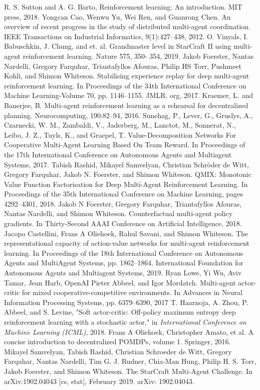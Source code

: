 \documentclass[runningheads]{llncs}
\begin{document}
\begin{thebibliography}{00}
	 R. S. Sutton and A. G. Barto, Reinforcement learning: An introduction.
	MIT press, 2018.
	Yongcan Cao, Wenwu Yu, Wei Ren, and Guanrong Chen. An overview of recent progress in
	the study of distributed multi-agent coordination. IEEE Transactions on Industrial Informatics,
	9(1):427–438, 2012.
	O. Vinyals, I. Babuschkin, J. Chung, and et. al. Grandmaster level in
	StarCraft II using multi-agent reinforcement learning. Nature 575, 350-
	354, 2019.
	Jakob Foerster, Nantas Nardelli, Gregory Farquhar, Triantafyllos Afouras, Philip HS Torr, Pushmeet
	Kohli, and Shimon Whiteson. Stabilising experience replay for deep multi-agent reinforcement
	learning. In Proceedings of the 34th International Conference on Machine Learning-Volume 70,
	pp. 1146–1155. JMLR. org, 2017.
	 Kraemer, L. and Banerjee, B. Multi-agent reinforcement
	learning as a rehearsal for decentralized planning. Neurocomputing,
	190:82–94, 2016.
	 Sunehag, P., Lever, G., Gruslys, A., Czarnecki, W. M., Zambaldi,
	V., Jaderberg, M., Lanctot, M., Sonnerat, N., Leibo,
	J. Z., Tuyls, K., and Graepel, T. Value-Decomposition
	Networks For Cooperative Multi-Agent Learning Based
	On Team Reward. In Proceedings of the 17th International
	Conference on Autonomous Agents and Multiagent
	Systems, 2017.
	 Tabish Rashid, Mikayel Samvelyan, Christian Schröder de Witt, Gregory Farquhar, Jakob N.
	Foerster, and Shimon Whiteson. QMIX: Monotonic Value Function Factorisation for Deep
	Multi-Agent Reinforcement Learning. In Proceedings of the 35th International Conference on
	Machine Learning, pages 4292–4301, 2018.
	 Jakob N Foerster, Gregory Farquhar, Triantafyllos Afouras, Nantas Nardelli, and Shimon Whiteson.
	Counterfactual multi-agent policy gradients. In Thirty-Second AAAI Conference on Artificial
	Intelligence, 2018.
	 Jacopo Castellini, Frans A Oliehoek, Rahul Savani, and Shimon Whiteson. The representational
	capacity of action-value networks for multi-agent reinforcement learning. In Proceedings of the
	18th International Conference on Autonomous Agents and MultiAgent Systems, pp. 1862–1864.
	International Foundation for Autonomous Agents and Multiagent Systems, 2019.
	Ryan Lowe, Yi Wu, Aviv Tamar, Jean Harb, OpenAI Pieter Abbeel, and Igor Mordatch. Multi-agent
	actor-critic for mixed cooperative-competitive environments. In Advances in Neural Information
	Processing Systems, pp. 6379–6390, 2017
	 T. Haarnoja, A. Zhou, P. Abbeel, and S. Levine, "Soft
	actor-critic: Off-policy maximum entropy deep reinforcement
	learning with a stochastic actor," in \emph{International Conference on Machine Learning (ICML)}, 2018.
	Frans A Oliehoek, Christopher Amato, et al. A concise introduction to decentralized POMDPs,
	volume 1. Springer, 2016.
	 Mikayel Samvelyan, Tabish Rashid, Christian Schroeder de Witt, Gregory Farquhar, Nantas
	Nardelli, Tim G. J. Rudner, Chia-Man Hung, Philip H. S. Torr, Jakob Foerster, and Shimon
	Whiteson. The StarCraft Multi-Agent Challenge. In arXiv:1902.04043 [cs, stat], February
	2019. arXiv: 1902.04043.
	

\end{thebibliography}
\end{document}
